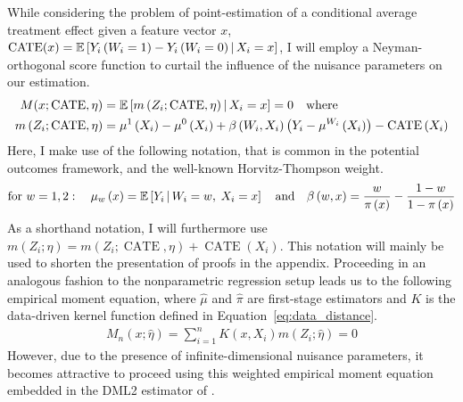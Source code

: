 While considering the problem of point-estimation of a conditional average
treatment effect given a feature vector $x$,
$\operatorname{CATE}(x) = \mathbb{E}\left[Y_{i}\left(W_{i} = 1\right) -
		Y_{i}\left(W_{i} = 0\right) \, \middle| \, X_{i} = x\right]$, I
will employ a Neyman-orthogonal score function to curtail the influence of the
nuisance parameters on our estimation.
\begin{equation}
	\begin{aligned}
		M(x; \operatorname{CATE}, \eta)
		 & = \mathbb{E}\left[m\left(Z_{i}; \operatorname{CATE}, \eta\right) \, \middle| \, X_{i} = x\right]
		= 0
		\quad \text{where} \quad                                                                                                                                                                                       \\
		m\left(Z_{i}; \operatorname{CATE}, \eta\right)
		 & = \mu^{1}\left(X_{i}\right) - \mu^{0}\left(X_{i}\right) + \beta\left(W_{i}, X_{i}\right)\left(Y_{i} - \mu^{W_{i}}\left(X_{i}\right)\right) - \operatorname{CATE}\left(X_{i}\right)
	\end{aligned}
\end{equation}
Here, I make use of the following notation, that is common in the potential
outcomes framework, and the well-known Horvitz-Thompson weight.
\begin{equation}
	\text{for }  w = 1,2: \quad \mu_w\left(x\right) = \mathbb{E}\left[Y_{i} \, \middle| \, W_{i} = w, \; X_{i} = x\right]
	\quad \text{and} \quad
	\beta\left(w, x\right) = \frac{w}{\pi\left(x\right)} - \frac{1 - w}{1 - \pi\left(x\right)}
\end{equation}
As a shorthand notation, I will furthermore use $m\left(Z_{i}; \eta\right) = m\left(Z_{i}; \operatorname{CATE}, \eta\right) + \operatorname{CATE}\left(X_{i}\right)$.
This notation will mainly be used to shorten the presentation of proofs in the appendix.
Proceeding in an analogous fashion to the nonparametric regression setup leads us to the following empirical moment equation, where $\hat{\mu}$ and $\hat{\pi}$ are first-stage estimators and $K$ is the data-driven kernel function defined in Equation~\ref{eq:data_distance}.
\begin{equation}
	\begin{aligned}
		M_{n}\left(x; \hat{\eta}\right)
		= \sum_{i = 1}^{n} K(x, X_{i}) m\left(Z_{i}; \hat{\eta}\right)
		= 0
	\end{aligned}
\end{equation}
However, due to the presence of infinite-dimensional nuisance parameters, it becomes attractive to proceed using this weighted empirical moment equation embedded in the DML2 estimator of \citet{chernozhukov_doubledebiased_2018}.
